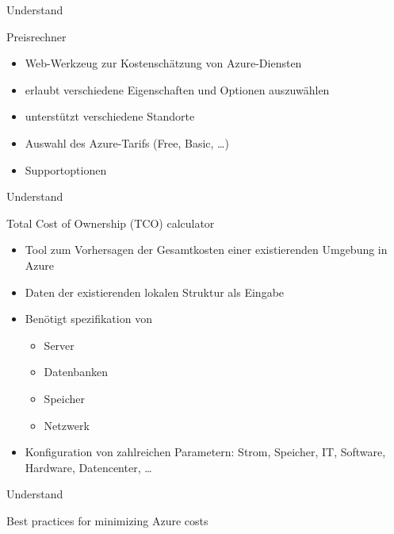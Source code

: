 \documentclass{scrartcl}
\newenvironment{flashcard}[2][]{%
    #1
    \vfill
    \centerline{\Large{#2}}
    \vfill
\newpage
}
{\newpage}
\begin{document}
    \begin{flashcard}[Understand]{Preisrechner}
        \begin{itemize}
            \item Web-Werkzeug zur Kostenschätzung von Azure-Diensten
            \item erlaubt verschiedene Eigenschaften und Optionen auszuwählen
            \item unterstützt verschiedene Standorte
            \item Auswahl des Azure-Tarifs (Free, Basic, \ldots)
            \item Supportoptionen
        \end{itemize}

    \end{flashcard}

    \begin{flashcard}[Understand]{Total Cost of Ownership (TCO) calculator}
        \begin{itemize}
            \item Tool zum Vorhersagen der Gesamtkosten einer existierenden Umgebung in Azure
            \item Daten der existierenden lokalen Struktur als Eingabe
            \item Benötigt spezifikation von
            \begin{itemize}
                \item Server
                \item Datenbanken
                \item Speicher
                \item Netzwerk
            \end{itemize}
            \item Konfiguration von zahlreichen Parametern:\newline
            Strom, Speicher, IT, Software, Hardware, Datencenter, \ldots
        \end{itemize}

    \end{flashcard}

    \begin{flashcard}[Understand]{Best practices for minimizing Azure costs}

    \end{flashcard}
\end{document}

